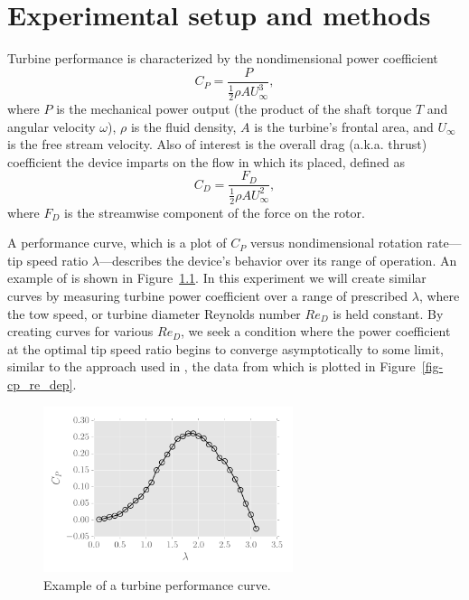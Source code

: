 \documentclass[12pt,letterpaper]{scrreprt}
\begin{document}
\chapter{Experimental setup and methods}

Turbine performance is characterized by the nondimensional power coefficient
\begin{equation}
C_P = \frac{P}{\frac{1}{2} \rho A U_\infty^3},
\label{eq-cp}
\end{equation}
where $P$ is the mechanical power output (the product of the shaft torque $T$
and angular velocity $\omega$), $\rho$ is the fluid density, $A$ is the
turbine's frontal area, and $U_\infty$ is the free stream velocity. Also of
interest is the overall drag (a.k.a. thrust) coefficient the device imparts on
the flow in which its placed, defined as
\begin{equation}
C_D = \frac{F_D}{\frac{1}{2} \rho A U_\infty^2},
\label{eq-cd}
\end{equation}
where $F_D$ is the streamwise component of the force on the rotor.

A performance curve, which is a plot of $C_P$ versus nondimensional rotation
rate---tip speed ratio $\lambda$---describes the device's behavior over its
range of operation. An example of is shown in Figure~\ref{fig-cp}. In this
experiment we will create similar curves by measuring turbine power coefficient
over a range of prescribed $\lambda$, where the tow speed, or turbine diameter
Reynolds number $Re_D$ is held constant. By creating curves for various $Re_D$,
we seek a condition where the power coefficient at the optimal tip speed ratio
begins to converge asymptotically to some limit, similar to the approach used in
\cite{Bachant2014}, the data from which is plotted in
Figure~\ref{fig-cp_re_dep}.

\begin{figure}[ht]
\centering
\includegraphics[width=0.65\textwidth]{Figures/cp_vs_tsr.pdf}
\caption{Example of a turbine performance curve.}
\label{fig-cp}
\end{figure}
\end{document}
